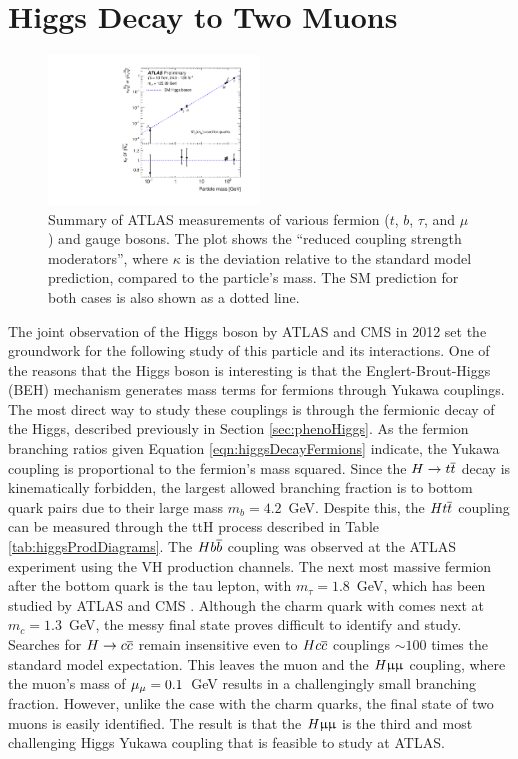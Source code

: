 \chapter{Higgs Decay to Two Muons}\label{sec:hmumu}

\begin{figure}[h!]
\captionsetup[subfigure]{position=b}
\centering
\includegraphics[width=0.5\textwidth]{figures/hmumu/massCouplingPlot.pdf}
\caption{Summary of ATLAS measurements of various fermion ($t$, $b$, $\tau$, and $\mu$) and gauge bosons. The plot shows the ``reduced coupling strength moderators'', where $\kappa$ is the deviation relative to the standard model prediction, compared to the particle's mass.
The SM prediction for both cases is also shown as a dotted line.
}
\label{fig:higgsMassCoupling}
\end{figure}

The joint observation of the Higgs boson by ATLAS \cite{atlashiggs} and CMS \cite{cmshiggs} in 2012 set the groundwork for the following study of this particle and its interactions.
One of the reasons that the Higgs boson is interesting is that the Englert-Brout-Higgs (BEH) mechanism generates mass terms for fermions through Yukawa couplings.
The most direct way to study these couplings is through the fermionic decay of the Higgs, described previously in Section \ref{sec:phenoHiggs}.
As the fermion branching ratios given Equation \ref{eqn:higgsDecayFermions} indicate, the Yukawa coupling is proportional to the fermion's mass squared.
Since the $H\to t\overline{t}$ decay is kinematically forbidden, the largest allowed branching fraction is to bottom quark pairs due to their large mass $m_b=4.2$~GeV. 
Despite this, the $Ht\overline{t}$ coupling can be measured through the ttH process described in Table \ref{tab:higgsProdDiagrams}.
The $Hb\overline{b}$ coupling was observed at the ATLAS experiment using the VH production channels. \cite{atlasHbb}
The next most massive fermion after the bottom quark is the tau lepton, with $m_\tau=1.8$~GeV, which has been studied by ATLAS \cite{atlasTauTau} and CMS \cite{cmsTauTau}.
Although the charm quark with comes next at $m_c=1.3$~GeV, the messy final state proves difficult to identify and study.
Searches for $H\to c\overline{c}$ remain insensitive even to $Hc\overline{c}$ couplings $\sim100$ times the standard model expectation.
This leaves the muon and the $H\upmu\upmu$ coupling, where the muon's mass of $\mu_\mu=0.1$~GeV results in a challengingly small branching fraction.
However, unlike the case with the charm quarks, the final state of two muons is easily identified.
The result is that the $H\upmu\upmu$ is the third and most challenging Higgs Yukawa coupling that is feasible to study at ATLAS.

